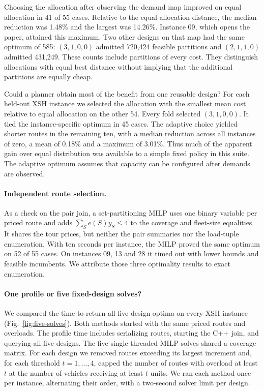 \documentclass[runningheads]{llncs}
\begin{document}
Choosing the allocation after observing the demand map improved on equal allocation in 41 of 55 cases. Relative to the equal-allocation distance, the median reduction was 1.48\% and the largest was 14.26\%. Instance 09, which opens the paper, attained this maximum. Two other designs on that map had the same optimum of 585: $(3,1,0,0)$ admitted 720,424 feasible partitions and $(2,1,1,0)$ admitted 431,249. These counts include partitions of every cost. They distinguish allocations with equal best distance without implying that the additional partitions are equally cheap.

Could a planner obtain most of the benefit from one reusable design? For each held-out XSH instance we selected the allocation with the smallest mean cost relative to equal allocation on the other 54. Every fold selected $(3,1,0,0)$. It tied the instance-specific optimum in 45 cases. The adaptive choice yielded shorter routes in the remaining ten, with a median reduction across all instances of zero, a mean of 0.18\% and a maximum of 3.01\%. Thus much of the apparent gain over equal distribution was available to a simple fixed policy in this suite. The adaptive optimum assumes that capacity can be configured after demands are observed.

\paragraph{Independent route selection.}
As a check on the pair join, a set-partitioning MILP uses one binary variable per priced route and adds $\sum_S e(S)y_S\leq4$ to the coverage and fleet-size equalities. It shares the tour prices, but neither the pair summaries nor the load-tuple enumeration. With ten seconds per instance, the MILP proved the same optimum on 52 of 55 cases. On instances 09, 13 and 28 it timed out with lower bounds and feasible incumbents. We attribute those three optimality results to exact enumeration.

\paragraph{One profile or five fixed-design solves?}
We compared the time to return all five design optima on every XSH instance (Fig.~\ref{fig:five-solves}). Both methods started with the same priced routes and overloads. The profile time includes serializing routes, starting the C++ join, and querying all five designs. The five single-threaded MILP solves shared a coverage matrix. For each design we removed routes exceeding its largest increment and, for each threshold $t=1,\ldots,4$, capped the number of routes with overload at least $t$ at the number of vehicles receiving at least $t$ units. We ran each method once per instance, alternating their order, with a two-second solver limit per design.
\end{document}
